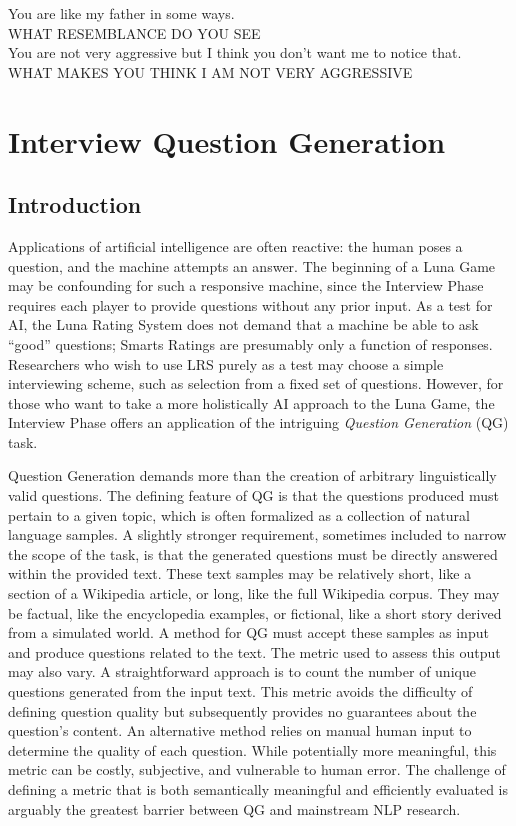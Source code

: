 \begin{savequote}[75mm]
You are like my father in some ways.\\
WHAT RESEMBLANCE DO YOU SEE\\
You are not very aggressive but I think you don't want me to notice that.\\
WHAT MAKES YOU THINK I AM NOT VERY AGGRESSIVE
\end{savequote}
\chapter{Interview Question Generation}

\section{Introduction}

Applications of artificial intelligence are often reactive: the human poses a question, and the machine attempts an answer. The beginning of a Luna Game may be confounding for such a responsive machine, since the Interview Phase requires each player to provide questions without any prior input. As a test for AI, the Luna Rating System does not demand that a machine be able to ask ``good'' questions; Smarts Ratings are presumably only a function of responses. Researchers who wish to use LRS purely as a test may choose a simple interviewing scheme, such as selection from a fixed set of questions. However, for those who want to take a more holistically AI approach to the Luna Game, the Interview Phase offers an application of the intriguing \textit{Question Generation} (QG) task.

Question Generation demands more than the creation of arbitrary linguistically valid questions. The defining feature of QG is that the questions produced must pertain to a given topic, which is often formalized as a collection of natural language samples. A slightly stronger requirement, sometimes included to narrow the scope of the task, is that the generated questions must be directly answered within the provided text. These text samples may be relatively short, like a section of a Wikipedia article, or long, like the full Wikipedia corpus. They may be factual, like the encyclopedia examples, or fictional, like a short story derived from a simulated world. A method for QG must accept these samples as input and produce questions related to the text. The metric used to assess this output may also vary. A straightforward approach is to count the number of unique questions generated from the input text. This metric avoids the difficulty of defining question quality but subsequently provides no guarantees about the question's content. An alternative method relies on manual human input to determine the quality of each question. While potentially more meaningful, this metric can be costly, subjective, and vulnerable to human error. The challenge of defining a metric that is both semantically meaningful and efficiently evaluated is arguably the greatest barrier between QG and mainstream NLP research.

